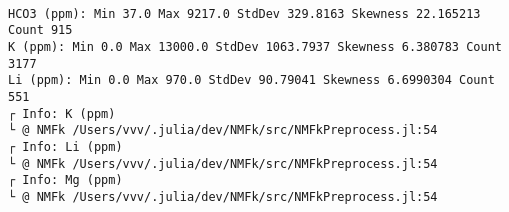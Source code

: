 \documentclass[11pt]{article}
\begin{document}
    \begin{center}
    \end{center}
    { \hspace*{\fill} \\}
    
    \begin{center}
    \end{center}
    { \hspace*{\fill} \\}
    
    \begin{center}
    \end{center}
    { \hspace*{\fill} \\}
    
    \begin{Verbatim}[commandchars=\\\{\}]
HCO3 (ppm): Min 37.0 Max 9217.0 StdDev 329.8163 Skewness 22.165213 Count 915
K (ppm): Min 0.0 Max 13000.0 StdDev 1063.7937 Skewness 6.380783 Count 3177
Li (ppm): Min 0.0 Max 970.0 StdDev 90.79041 Skewness 6.6990304 Count 551
┌ Info: K (ppm)
└ @ NMFk /Users/vvv/.julia/dev/NMFk/src/NMFkPreprocess.jl:54
┌ Info: Li (ppm)
└ @ NMFk /Users/vvv/.julia/dev/NMFk/src/NMFkPreprocess.jl:54
┌ Info: Mg (ppm)
└ @ NMFk /Users/vvv/.julia/dev/NMFk/src/NMFkPreprocess.jl:54
    \end{Verbatim}

    \begin{center}
    \end{center}
    { \hspace*{\fill} \\}
    
    \begin{center}
    \end{center}
    { \hspace*{\fill} \\}
    
\end{document}

